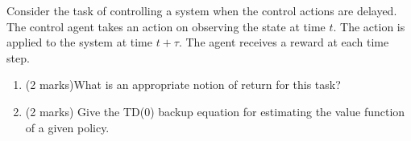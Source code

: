 \documentclass[addpoints,12pt,solution]{exam}
\begin{document}
\begin{questions}
\question[4] Consider the task of controlling a system when the control actions are delayed. The control agent takes an action on observing the state at time $t$. The action is applied to the system at time $t + \tau$. The agent
receives a reward at each time step.
\begin{enumerate}[label=(\alph*)]
\item (2 marks)What is an appropriate notion of return for this task?
\begin{solution}
\end{solution}
\item (2 marks) Give the TD(0) backup equation for estimating the value function of a given policy.
\begin{solution}
\end{solution}
\end{enumerate}
\end{questions}
\end{document}
